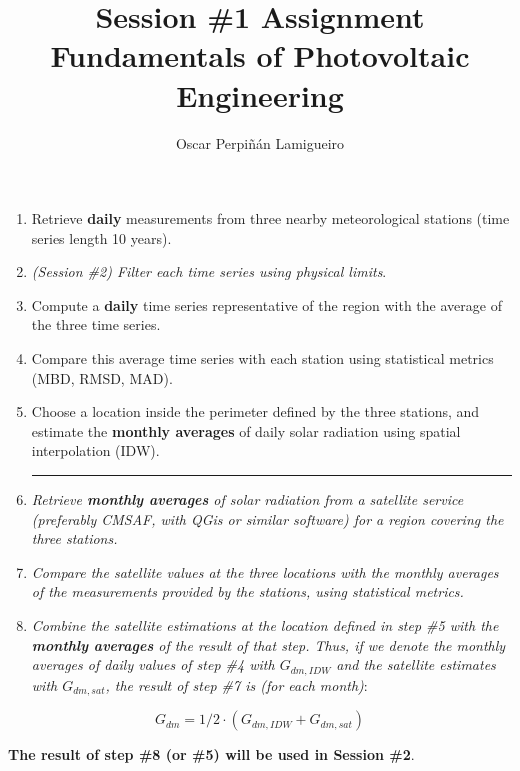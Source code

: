 \documentclass[11pt]{article}
\author{Oscar Perpiñán Lamigueiro}
\date{}
\title{Session \#1 Assignment\\\medskip
\large Fundamentals of Photovoltaic Engineering}
\begin{document}
\maketitle
\begin{enumerate}
\item Retrieve \textbf{daily} measurements from three nearby meteorological stations (time series length 10 years).
\item \emph{(Session \#2) Filter each time series using physical limits}.
\item Compute a \textbf{daily} time series representative of the region with the average of the three time series.
\item Compare this average time series with each station using statistical metrics (MBD, RMSD, MAD).
\item Choose a location inside the perimeter defined by the three stations, and estimate the \textbf{monthly averages} of daily solar radiation using spatial interpolation (IDW).

\noindent\rule{\textwidth}{0.5pt}
\item \emph{Retrieve \textbf{monthly averages} of solar radiation from a satellite service (preferably CMSAF, with QGis or similar software) for a region covering the three stations.}
\item \emph{Compare the satellite values at the three locations with the monthly averages of the measurements provided by the stations, using statistical metrics.}
\item \emph{Combine the satellite estimations at the location defined in step \#5 with the \textbf{monthly averages} of the result of that step. Thus, if we denote the monthly averages of daily values of step \#4 with \(G_{dm,IDW}\) and the satellite estimates with \(G_{dm,sat}\), the result of step \#7 is (for each month)}:
\end{enumerate}
\[G_{dm} = 1/2 \cdot (G_{dm,IDW} + G_{dm,sat})\]

\textbf{The result of step \#8 (or \#5) will be used in Session \#2}.
\end{document}
